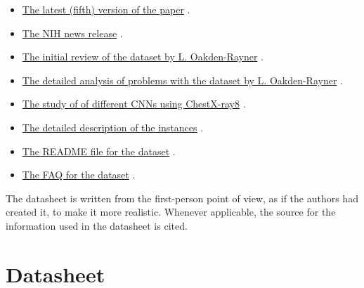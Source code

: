 \documentclass{article}
\begin{document}
\begin{itemize}
    \item \href{https://arxiv.org/abs/1705.02315v5}{The latest (fifth) version of the paper} \cite{Wang2017}.
    \item \href{https://www.nih.gov/news-events/news-releases/nih-clinical-center-provides-one-largest-publicly-available-chest-X-ray-datasets-scientific-community}{The NIH news release} \cite{Health2017}.
    \item \href{https://lukeoakdenrayner.wordpress.com/2017/11/18/quick-thoughts-on-chestxray14-performance-claims-and-clinical-tasks/}{The initial review of the dataset by L. Oakden-Rayner} \cite{OakdenRayner2017}.
    \item \href{https://lukeoakdenrayner.wordpress.com/2017/12/18/the-chestxray14-dataset-problems/}{The detailed analysis of problems with the dataset by L. Oakden-Rayner} \cite{OakdenRayner2018}.
    \item \href{https://www.nature.com/articles/s41598-019-42294-8}{The study of of different CNNs using ChestX-ray8} \cite{Baltruschat2019}.
    \item \href{https://nihcc.app.box.com/v/ChestXray-NIHCC/file/219760887468}{The detailed description of the instances} \cite{HealthClinicalCenter2017}.
    \item \href{https://nihcc.app.box.com/v/ChestXray-NIHCC/file/220660789610}{The README file for the dataset} \cite{HealthClinicalCenter2017}.
    \item \href{https://nihcc.app.box.com/v/ChestXray-NIHCC/file/249502714403}{The FAQ for the dataset} \cite{HealthClinicalCenter2017}.
\end{itemize}

The datasheet is written from the first-person point of view, as if the authors had created it, to make it more realistic. Whenever applicable, the source for the information used in the datasheet is cited.

\section{Datasheet}
\end{document}
